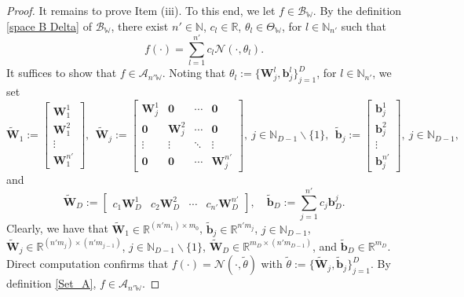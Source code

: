 \documentclass[11pt]{article}
\begin{document}
\begin{proof}
It remains to prove Item (iii).
To this end, we let $f\in\mathcal{B}_{\mathbb{W}}$. By the definition \eqref{space B Delta} of $\mathcal{B}_{\mathbb{W}}$, there exist $n'\in \mathbb{N}$, $c_l\in\mathbb{R}$, $\theta_l\in \Theta_\mathbb{W}$, for $l\in \mathbb{N}_{n'}$ such that 
$$
f(\cdot)=\sum_{l=1}^{n'} c_l\mathcal{N}(\cdot,\theta_l).
$$
It suffices to show that $f\in\mathcal{A}_{n'\mathbb{W}}$.
Noting that $\theta_l:=\{\mathbf{W}_j^l,\mathbf{b}_j^l\}_{j=1}^D$, for  $l\in\mathbb{N}_{n'}$,
we set 
\begin{equation*}
\widetilde{\mathbf{W}}_{1}:=\left[\begin{array}{c}
             \mathbf{W}_1^1  \\
              \mathbf{W}_1^2\\
              \vdots\\
              \mathbf{W}_1^{n'}
\end{array}\right],\ \
\widetilde{\mathbf{W}}_j:=\left[\begin{array}{cccc}
\mathbf{W}_j^1 & \mathbf{0} & \cdots & \mathbf{0} \\
\mathbf{0} & \mathbf{W}_j^2 & \cdots & \mathbf{0} \\
\vdots & \vdots & \ddots & \vdots \\
\mathbf{0} & \mathbf{0} & \cdots & \mathbf{W}_j^{n'}
\end{array}\right],\ j\in\mathbb{N}_{D-1}\backslash\{1\}, 
\ \
\widetilde{\mathbf{b}}_{j}:=\left[\begin{array}{c}
             \mathbf{b}_j^1  \\
              \mathbf{b}_j^2\\
              \vdots\\
              \mathbf{b}_j^{n'}
\end{array}\right],\ j\in\mathbb{N}_{D-1},
\end{equation*}
and 
\begin{equation*}
\widetilde{\mathbf{W}}_D:=\left[\begin{array}{cccc}
c_1\mathbf{W}_D^1 & c_2\mathbf{W}_D^2 & \cdots & c_{n'}\mathbf{W}_D^{n'}
\end{array}\right],\quad \widetilde{\mathbf{b}}_{D}:=\sum\limits_{j=1}^{n'} c_j \mathbf{b}_D^j. 
\end{equation*}
Clearly, we have that
$
\widetilde{\mathbf{W}}_{1}\in\mathbb{R}^{(n'm_1)\times {m_0}}$, $\widetilde{\mathbf{b}}_{j}\in\mathbb{R}^{n'm_j}$, $j\in\mathbb{N}_{D-1}$,
$\widetilde{\mathbf{W}}_j\in\mathbb{R}^{(n'm_j)\times (n'm_{j-1})}$, $j\in\mathbb{N}_{D-1}\backslash\{1\}$, 
$\widetilde{\mathbf{W}}_D\in\mathbb{R}^{m_D\times (n'm_{D-1})}$, and $\widetilde{\mathbf{b}}_{D}\in\mathbb{R}^{m_D}$. 
Direct computation confirms that $f(\cdot)=\mathcal{N}(\cdot,\widetilde{\theta})$
with $\widetilde{\theta}:=\{\widetilde{\mathbf{W}}_j,\widetilde{\mathbf{b}}_j\}_{j=1}^D$. By definition \eqref{Set_A}, $f\in\mathcal{A}_{n'\mathbb{W}}$. 
\end{proof}
\end{document}
